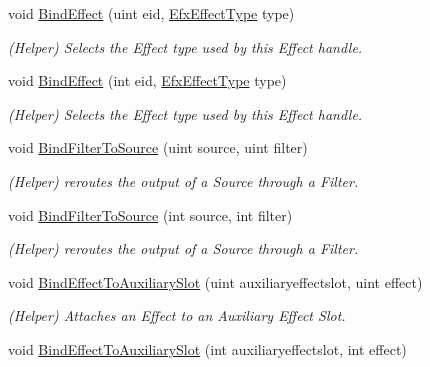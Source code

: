 \begin{DoxyCompactItemize}
\item 
void \hyperlink{class_open_t_k_1_1_audio_1_1_open_a_l_1_1_effects_extension_a51dbc9c91c556f374c9760c29675aff9}{Bind\-Effect} (uint eid, \hyperlink{namespace_open_t_k_1_1_audio_1_1_open_a_l_a224be2a7f650eba92828d53342bfbc30}{Efx\-Effect\-Type} type)
\begin{DoxyCompactList}\small\item\em (Helper) Selects the Effect type used by this Effect handle.\end{DoxyCompactList}\item 
void \hyperlink{class_open_t_k_1_1_audio_1_1_open_a_l_1_1_effects_extension_a60c86618c3c17d8e6363c791ff141e3e}{Bind\-Effect} (int eid, \hyperlink{namespace_open_t_k_1_1_audio_1_1_open_a_l_a224be2a7f650eba92828d53342bfbc30}{Efx\-Effect\-Type} type)
\begin{DoxyCompactList}\small\item\em (Helper) Selects the Effect type used by this Effect handle.\end{DoxyCompactList}\item 
void \hyperlink{class_open_t_k_1_1_audio_1_1_open_a_l_1_1_effects_extension_acea6e441f40da3cae17f60968cfb2640}{Bind\-Filter\-To\-Source} (uint source, uint filter)
\begin{DoxyCompactList}\small\item\em (Helper) reroutes the output of a Source through a Filter.\end{DoxyCompactList}\item 
void \hyperlink{class_open_t_k_1_1_audio_1_1_open_a_l_1_1_effects_extension_acceb9bfc2ded3608543a0e438cacd602}{Bind\-Filter\-To\-Source} (int source, int filter)
\begin{DoxyCompactList}\small\item\em (Helper) reroutes the output of a Source through a Filter.\end{DoxyCompactList}\item 
void \hyperlink{class_open_t_k_1_1_audio_1_1_open_a_l_1_1_effects_extension_a13cde333c8c4dc323cfaeaee3313f595}{Bind\-Effect\-To\-Auxiliary\-Slot} (uint auxiliaryeffectslot, uint effect)
\begin{DoxyCompactList}\small\item\em (Helper) Attaches an Effect to an Auxiliary Effect Slot.\end{DoxyCompactList}\item 
void \hyperlink{class_open_t_k_1_1_audio_1_1_open_a_l_1_1_effects_extension_ac14c1c8b6abfebe99d2a32f88c584c85}{Bind\-Effect\-To\-Auxiliary\-Slot} (int auxiliaryeffectslot, int effect)

\end{DoxyCompactItemize}
